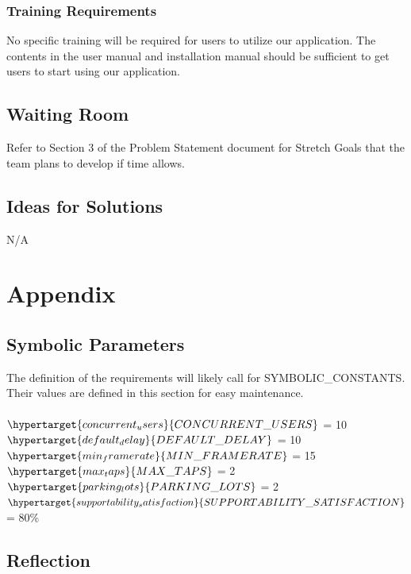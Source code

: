 \documentclass[12pt,letterpaper]{article}
\begin{document}
\subsubsection{Training Requirements}
No specific training will be required for users to utilize our application. The
contents in the user manual and installation manual should be sufficient to get
users to start using our application.
\subsection{Waiting Room}
Refer to Section 3 of the Problem Statement document for Stretch Goals that the
team plans to develop if time allows.
\subsection{Ideas for Solutions}
N/A

\newpage
\section{Appendix}
\label{appendix}
\subsection{Symbolic Parameters}
The definition of the requirements will likely call for SYMBOLIC\_CONSTANTS.
Their values are defined in this section for easy maintenance.\\ \\
$\hypertarget{concurrent_users}{CONCURRENT\_USERS}$ = 10 \\
$\hypertarget{default_delay}{DEFAULT\_DELAY}$ = 10 \\
$\hypertarget{min_framerate}{MIN\_FRAMERATE}$ = 15 \\
$\hypertarget{max_taps}{MAX\_TAPS}$ = 2 \\
$\hypertarget{parking_lots}{PARKING\_LOTS}$ = 2 \\
$\hypertarget{supportability_satisfaction}{SUPPORTABILITY\_SATISFACTION}$ = 80\%
\\

\subsection{Reflection}
\label{reflection}
\end{document}
